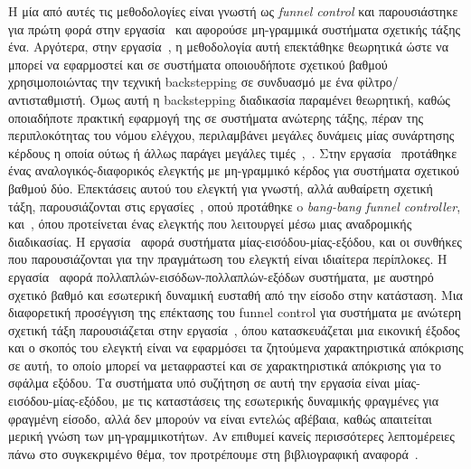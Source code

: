 Η μία από αυτές τις μεθοδολογίες είναι γνωστή ως \textlatin{\emph{funnel control}} και παρουσιάστηκε για πρώτη φορά στην εργασία~\cite{ilchmann2002tracking} και αφορούσε μη-γραμμικά συστήματα σχετικής τάξης ένα. Αργότερα, στην εργασία~\cite{ilchmann2007tracking}, η μεθοδολογία αυτή επεκτάθηκε θεωρητικά ώστε να μπορεί να εφαρμοστεί και σε συστήματα οποιουδήποτε σχετικού βαθμού χρησιμοποιώντας την τεχνική \textlatin{backstepping} σε συνδυασμό με ένα φίλτρο/αντισταθμιστή. Όμως αυτή η \textlatin{backstepping} διαδικασία παραμένει θεωρητική, καθώς οποιαδήποτε πρακτική εφαρμογή της σε συστήματα ανώτερης τάξης, πέραν της περιπλοκότητας του νόμου ελέγχου, περιλαμβάνει μεγάλες δυνάμεις μίας συνάρτησης κέρδους η οποία ούτως ή άλλως παράγει μεγάλες τιμές~\cite[Παρατήρηση 2.3]{Berger2018},~\cite{Hackl2012}. Στην εργασία~\cite{Hackl2013} προτάθηκε ένας αναλογικός-διαφορικός ελεγκτής με μη-γραμμικό κέρδος για συστήματα σχετικού βαθμού δύο. Επεκτάσεις αυτού του ελεγκτή για γνωστή, αλλά αυθαίρετη σχετική τάξη, παρουσιάζονται στις εργασίες~\cite{Liberzon2013}, οπού προτάθηκε o \textlatin{\emph{bang-bang funnel controller}}, και~\cite{Berger2018}, όπου προτείνεται ένας ελεγκτής που λειτουργεί μέσω μιας αναδρομικής διαδικασίας. Η εργασία~\cite{Liberzon2013} αφορά συστήματα μίας-εισόδου-μίας-εξόδου, και οι συνθήκες που παρουσιάζονται για την πραγμάτωση του ελεγκτή είναι ιδιαίτερα περίπλοκες. Η εργασία~\cite{Berger2018} αφορά πολλαπλών-εισόδων-πολλαπλών-εξόδων συστήματα, με αυστηρό σχετικό βαθμό και εσωτερική δυναμική ευσταθή από την είσοδο στην κατάσταση. Μια διαφορετική προσέγγιση της επέκτασης του \textlatin{funnel control} για συστήματα με ανώτερη σχετική τάξη παρουσιάζεται στην εργασία~\cite{chowdhury2017funnel}, όπου  κατασκευάζεται μια εικονική έξοδος και ο σκοπός του ελεγκτή είναι να εφαρμόσει τα ζητούμενα χαρακτηριστικά απόκρισης σε αυτή, το οποίο μπορεί να μεταφραστεί και σε χαρακτηριστικά απόκρισης για το σφάλμα εξόδου. Τα συστήματα υπό συζήτηση σε αυτή την εργασία είναι μίας-εισόδου-μίας-εξόδου, με τις καταστάσεις της εσωτερικής δυναμικής φραγμένες για φραγμένη είσοδο, αλλά δεν μπορούν να είναι εντελώς αβέβαια, καθώς απαιτείται μερική γνώση των μη-γραμμικοτήτων. Αν επιθυμεί κανείς περισσότερες λεπτομέρειες πάνω στο συγκεκριμένο θέμα, τον προτρέπουμε στη βιβλιογραφική αναφορά~\cite{ilchmann2008high}.

